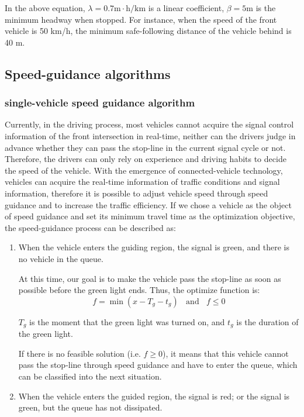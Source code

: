\documentclass[10.5pt,compsoc]{TsT}
\theoremstyle{mystyle}
\renewcommand{\labelenumi}{(\arabic{enumi})}
\begin{document}
{In the above equation, $\lambda = 0.7 \mathrm{m\cdot h/km}$ is a linear coefficient, $\beta = 5\mathrm{m}$ is the minimum headway when stopped. For instance, when the speed of the front vehicle is 50
km/h, the minimum safe-following distance of the vehicle behind is 40 m.

\subsection{Speed-guidance algorithms}

\subsubsection{single-vehicle speed guidance algorithm}

Currently, in the driving process, most vehicles cannot acquire the
signal control information of the front intersection in real-time,
neither can the drivers judge in advance whether they can pass the
stop-line in the current signal cycle or not. Therefore, the drivers can
only rely on experience and driving habits to decide the speed of the
vehicle. With the emergence of connected-vehicle technology, vehicles
can acquire the real-time information of traffic conditions and signal
information, therefore it is possible to adjust vehicle speed through
speed guidance and to increase the traffic efficiency. If we chose a
vehicle as the object of speed guidance and set its minimum travel time
as the optimization objective, the speed-guidance process can be
described as:

\begin{enumerate}
\def\labelenumi{\alph{enumi})}
\item
  When the vehicle enters the guiding region, the signal is green, and
  there is no vehicle in the queue.

At this time, our goal is to make the vehicle pass the stop-line as soon
as possible before the green light ends. Thus, the optimize function is:
$$f=\min(x-T_g-t_g) \ \ \ \ \text{and}\ \ \ \ f \le 0$$

$T_g$ is the moment that the green light was turned on, and $t_g$ is the duration of
the green light.

If there is no feasible solution (i.e. $f \ge 0$), it means that this vehicle
cannot pass the stop-line through speed guidance and have to enter the
queue, which can be classified into the next situation.
\item
  When the vehicle enters the guided region, the signal is red; or the
  signal is green, but the queue has not dissipated.



\end{enumerate}}
\end{document}
